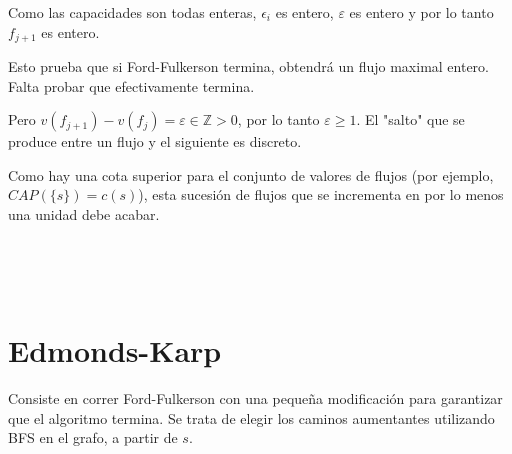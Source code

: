 \documentclass[10pt,a4paper]{article}
\begin{document}
Como las capacidades son todas enteras, $\epsilon_i$ es entero, $\varepsilon $ es entero y por lo tanto $f_{j+1}$ es entero.

Esto prueba que si Ford-Fulkerson termina, obtendrá un flujo maximal entero. Falta probar que efectivamente termina.

Pero $v(f_{j+1}) - v(f_j) = \varepsilon \in \mathbb{Z} > 0$, por lo tanto $\varepsilon \geq 1$. El "salto" que se produce entre un flujo y el siguiente es discreto.

Como hay una cota superior para el conjunto de valores de flujos (por ejemplo, $CAP(\{s\}) = c(s)$), esta sucesión de flujos que se incrementa en por lo menos una unidad debe acabar.

 

 

\section*{Edmonds-Karp}

Consiste en correr Ford-Fulkerson con una pequeña modificación para garantizar que el algoritmo termina. Se trata de elegir los caminos aumentantes utilizando BFS en el grafo, a partir de $s$.
\end{document}
